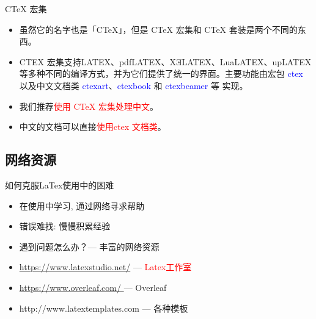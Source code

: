 \documentclass[13pt]{ctexbeamer}
\newcommand{\red}[1]{\textcolor{red}{#1}}
\newcommand{\blue}[1]{\textcolor{blue}{#1}}
\begin{document}
\begin{frame}{CTeX 宏集}
	\begin{itemize}
		\item
		虽然它的名字也是「CTeX」，但是 CTeX 宏集和 CTeX 套装是两个不同的东西。
		\item  CTEX 宏集支持LATEX、pdfLATEX、XƎLATEX、LuaLATEX、upLATEX 等多种不同的编译方式，并为它们提供了统一的界面。主要功能由宏包  \blue{ctex} 以及中文文档类  \blue{ctexart}、\blue{ctexbook} 和  \blue{ctexbeamer}  等 实现。
		\item 我们推荐\red{使用 CTeX 宏集处理中文}。
		\item 中文的文档可以直接\red{使用ctex 文档类}。
	\end{itemize}


\end{frame}



\subsection{网络资源}




\begin{frame}{如何克服LaTex使用中的困难}
	\begin{itemize}
\item 	  在使用中学习, 通过网络寻求帮助

\item 	  错误难找: 慢慢积累经验

\item 	  遇到问题怎么办？---  丰富的网络资源

	\end{itemize}


\begin{itemize}
    \item
   \blue{ \href{https://www.latexstudio.net/}{https://www.latexstudio.net/} }   ---     \red{Latex工作室}
    \item
    \href{https://www.overleaf.com?r=4c8832b9&rm=d&rs=b
}{https://www.overleaf.com/
}   ---  Overleaf
\item
http://www.latextemplates.com --- 各种模板

\end{itemize}
\end{frame}
\end{document}

